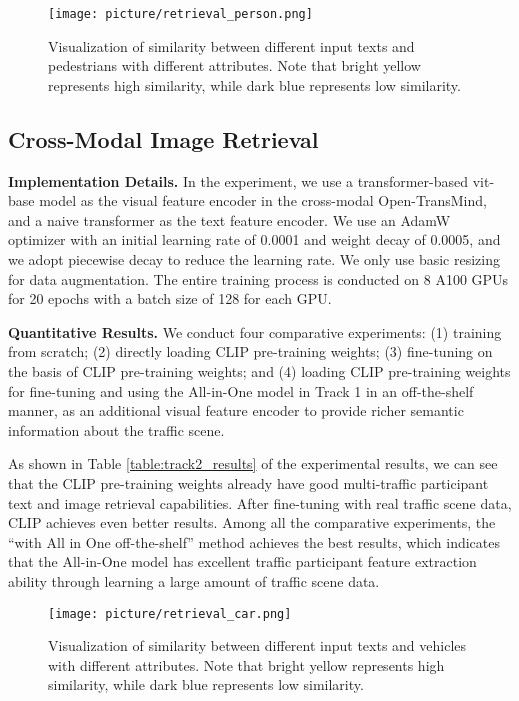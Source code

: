 \documentclass[10pt,twocolumn,letterpaper]{article}
\begin{document}
{\begin{figure}[t]
  \centering
\texttt{[image: picture/retrieval\_person.png]}
   \caption{Visualization of similarity between different input texts and pedestrians with different attributes. Note that bright yellow represents high similarity, while dark blue represents low similarity.}
   \label{fig:retrieval_person}
\end{figure}


\subsection{Cross-Modal Image Retrieval}
\textbf{Implementation Details.} In the experiment, we use a transformer-based vit-base model as the visual feature encoder in the cross-modal Open-TransMind, and a naive transformer as the text feature encoder. We use an AdamW optimizer with an initial learning rate of 0.0001 and weight decay of 0.0005, and we adopt piecewise decay to reduce the learning rate. We only use basic resizing for data augmentation. The entire training process is conducted on 8 A100 GPUs for 20 epochs with a batch size of 128 for each GPU.

\textbf{Quantitative Results.} We conduct four comparative experiments: (1) training from scratch; (2) directly loading CLIP pre-training weights; (3) fine-tuning on the basis of CLIP pre-training weights; and (4) loading CLIP pre-training weights for fine-tuning and using the All-in-One model in Track 1 in an off-the-shelf manner, as an additional visual feature encoder to provide richer semantic information about the traffic scene.

As shown in Table \ref{table:track2_results} of the experimental results, we can see that the CLIP pre-training weights already have good multi-traffic participant text and image retrieval capabilities. After fine-tuning with real traffic scene data, CLIP achieves even better results. Among all the comparative experiments, the ``with All in One off-the-shelf'' method achieves the best results, which indicates that the All-in-One model has excellent traffic participant feature extraction ability through learning a large amount of traffic scene data.


\begin{figure}[t]
  \centering
\texttt{[image: picture/retrieval\_car.png]}
   \caption{Visualization of similarity between different input texts and vehicles with different attributes. Note that bright yellow represents high similarity, while dark blue represents low similarity.}
   \label{fig:retrieval_car}
\end{figure}


}
\end{document}
